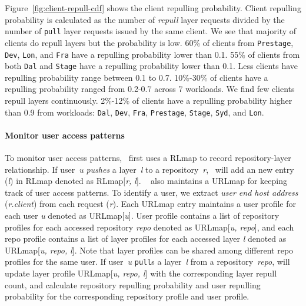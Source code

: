 Figure~\ref{fig:client-repull-cdf} shows the client repulling probability.
Client repulling probability is calculated as the number of \emph{repull} layer requests divided by
the number of \texttt{pull} layer requests issued by the same client.
We see that majority of clients do repull layers but the probability is low.
60\% of clients from \texttt{Prestage}, \texttt{Dev}, \texttt{Lon}, and \texttt{Fra} have a repulling probability lower than 0.1.
55\% of clients from both \texttt{Dal} and \texttt{Stage} have a repulling probability lower than 0.1.
Less clients have repulling probability range between 0.1 to 0.7.
10\%-30\% of clients have a repulling probability ranged from 0.2-0.7 across 7 workloads.
We find few clients repull layers continuously.
2\%-12\% of clients have a repulling probability higher than 0.9 from workloads:
\texttt{Dal}, \texttt{Dev}, \texttt{Fra}, \texttt{Prestage},
\texttt{Stage}, \texttt{Syd}, and \texttt{Lon}.

\paragraph{Monitor user access patterns}
To monitor user access patterns,
\preconstructcachename~first uses a RLmap to record repository-layer relationship.
If user~\emph{u} \emph{pushes} a  layer~\emph{l} to a repository~\emph{r},
\preconstructcachename~will add an new entry (\emph{l}) in RLmap denoted as RLmap[\emph{r, l}]. 
\preconstructcachename~ also maintains a URLmap for keeping track of user access patterns.
To identify a user, 
we extract \emph{user end host address} (\emph{r.client}) from each request (\emph{r}). 
Each URLmap entry maintains a user profile for each user \emph{u} denoted as URLmap[\emph{u}]. %
User profile contains a list of repository profiles for each accessed repository \emph{repo} denoted as URLmap[\emph{u, repo}],
and each repo profile contains a list of layer profiles for each accessed layer \emph{l}  denoted as URLmap[\emph{u, repo, l}].
Note that layer profiles can be shared among different repo profiles for the same user.
If user~\emph{u} \texttt{pull}s a layer~\emph{l} from a repository~\emph{repo},
\preconstructcachename will update layer profile URLmap[\emph{u, repo, l}] with the corresponding layer repull count, and calculate
repository repulling probability and user repulling probability for the corresponding repository profile and user profile.

